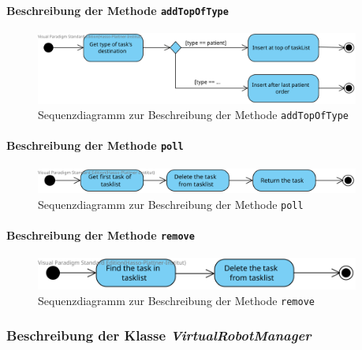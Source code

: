 			\paragraph{Beschreibung der Methode \texttt{addTopOfType}}		
			\begin{figure}[H]
			\centering
			\includegraphics[width=0.95\textwidth]{img/addTopOfType}
			\caption{Sequenzdiagramm zur Beschreibung der Methode \texttt{addTopOfType}}
			\label{SequenzQueueAddTopOfType}
			\end{figure}			
				
			\paragraph{Beschreibung der Methode \texttt{poll}}		
			\begin{figure}[H]
			\centering
			\includegraphics[width=0.95\textwidth]{img/2-Entwurf-poll}
			\caption{Sequenzdiagramm zur Beschreibung der Methode \texttt{poll}}
			\label{SequenzQueuePoll}
			\end{figure}			
				
			\paragraph{Beschreibung der Methode \texttt{remove}}		
			\begin{figure}[H]
			\centering
			\includegraphics[width=0.95\textwidth]{img/2-Entwurf-remove}
			\caption{Sequenzdiagramm zur Beschreibung der Methode \texttt{remove}}
			\label{SequenzQueueRemove}
			\end{figure}			
			
	\subsubsection{Beschreibung der Klasse \textit{VirtualRobotManager}}

